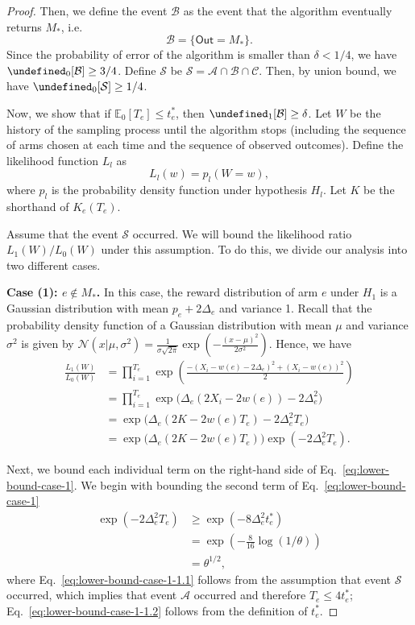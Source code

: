 \documentclass{article}
\newcommand{\E}{\mathbb E}
\newcommand{\out}{\mathsf{Out}}
\let\Pr\undefined
\DeclareMathOperator{\Pr}{Pr}
\begin{document}
\begin{spacing}{1.1}
\begin{proof}
Then, we define the event $\mathcal B$ as the event that the algorithm eventually returns $M_*$, i.e.
$$
\mathcal B=\{\out=M_*\}.
$$
Since the probability of error of the algorithm is smaller than $\delta < 1/4$, we have $\Pr_0[\mathcal B] \ge 3/4$.
Define $\mathcal S$ be $\mathcal S=\mathcal A\cap \mathcal B \cap \mathcal C$. 
Then, by union bound, we have $\Pr_0[\mathcal S]\ge 1/4$.

Now, we show that if $\E_0[T_e] \le t_e^*$, then $\Pr_1[\mathcal B] \ge \delta$.
Let $W$ be the history of the sampling process until the algorithm stops (including the sequence of arms chosen at each time and the sequence of observed outcomes).
Define the likelihood function $L_l$ as 
$$
L_l(w) = p_l(W=w),
$$
where $p_l$ is the probability density function under hypothesis $H_l$.
Let $K$ be the shorthand of $K_e(T_e)$.

Assume that the event $\mathcal S$ occurred.
We will bound the likelihood ratio $L_1(W)/L_0(W)$ under this assumption. 
To do this, we divide our analysis into two different cases.

\textbf{Case (1): $e\not \in M_*$.}
In this case, the reward distribution of arm $e$ under $H_1$ is a Gaussian distribution with mean $p_e+2\Delta_e$ and variance 1. 
Recall that the probability density function of a Gaussian distribution with mean $\mu$ and variance $\sigma^2$ is given by
$\mathcal N(x | \mu,\sigma^2)=\frac{1}{\sigma\sqrt{2\pi}}\exp\left(-\frac{(x-\mu)^2}{2\sigma^2}\right)$.
Hence, we have
\begin{align}
  \frac{L_1(W)}{L_0(W)} &= \prod_{i=1}^{T_e} \exp\left(\frac{-(X_i-w(e)-2\Delta_e)^2+(X_i-w(e))^2}{2}\right) \nonumber \\
  						&= \prod_{i=1}^{T_e} \exp\big(\Delta_e(2X_i-2w(e))-2\Delta_e^2\big) \nonumber \\
  						&= \exp\big(\Delta_e(2K-2w(e)T_e)-2\Delta_e^2T_e\big) \nonumber \\
  						&= \exp\big(\Delta_e(2K-2w(e)T_e)\big)\exp(-2\Delta_e^2T_e) \label{eq:lower-bound-case-1}.
\end{align}

Next, we bound each individual term on the right-hand side of Eq.~\eqref{eq:lower-bound-case-1}.
We begin with bounding the second term of Eq.~\eqref{eq:lower-bound-case-1}
\begin{align}
	\exp(-2\Delta_e^2T_e) &\ge \exp(-8\Delta_e^2t_e^*) \label{eq:lower-bound-case-1-1.1} \\
						  &=\exp\left(-\frac{8}{16}\log(1/\theta)\right) \label{eq:lower-bound-case-1-1.2}\\
						  &= \theta^{1/2}\label{eq:lower-bound-case-1-1.3},
\end{align}
where Eq.~\eqref{eq:lower-bound-case-1-1.1} follows from the assumption that event $\mathcal S$ occurred, which implies that event $\mathcal A$ occurred and therefore $T_e \le 4t_e^*$; Eq.~\eqref{eq:lower-bound-case-1-1.2} follows from the definition of $t_e^*$.


\end{proof}
\end{spacing}
\end{document}
